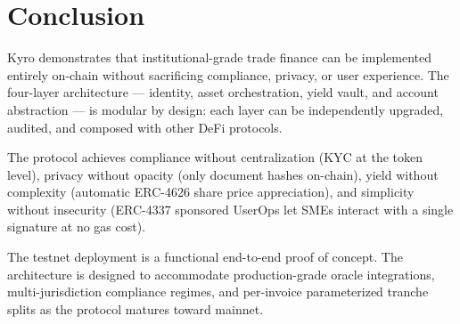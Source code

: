 \documentclass[11pt,a4paper]{article}
\begin{document}
\section{Conclusion}

Kyro demonstrates that institutional-grade trade finance can be implemented entirely on-chain
without sacrificing compliance, privacy, or user experience. The four-layer architecture —
identity, asset orchestration, yield vault, and account abstraction — is modular by design:
each layer can be independently upgraded, audited, and composed with other DeFi protocols.

The protocol achieves compliance without centralization (KYC at the token level),
privacy without opacity (only document hashes on-chain), yield without complexity
(automatic ERC-4626 share price appreciation), and simplicity without insecurity
(ERC-4337 sponsored UserOps let SMEs interact with a single signature at no gas cost).

The testnet deployment is a functional end-to-end proof of concept. The architecture
is designed to accommodate production-grade oracle integrations, multi-jurisdiction
compliance regimes, and per-invoice parameterized tranche splits as the protocol
matures toward mainnet.

\end{document}
